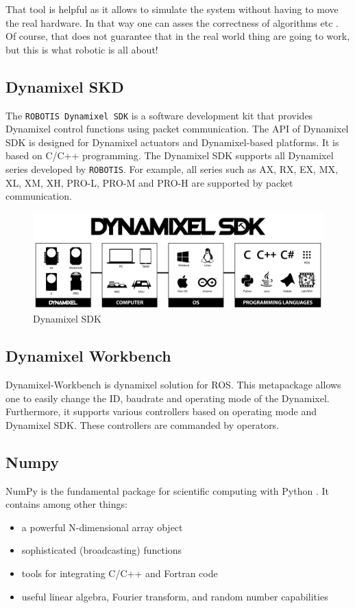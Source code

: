 That tool is helpful as it allows to simulate the system without having to move the real hardware. In that way one can asses the correctness of algorithms etc . Of course, that does not guarantee that in the real world thing are going to work, but this is what robotic is all about!

\subsection{Dynamixel SKD}
The \texttt{ROBOTIS Dynamixel SDK} is a software development kit that provides Dynamixel control functions using packet communication. The API of Dynamixel SDK is designed for Dynamixel actuators and Dynamixel-based platforms. It is based on C/C++ programming. The Dynamixel SDK supports all Dynamixel series developed by \texttt{ROBOTIS}. For example, all series such as AX, RX, EX, MX, XL, XM, XH, PRO-L, PRO-M and PRO-H are supported by packet communication.
\begin{figure}
	\centering
	\includegraphics[width=\textwidth]{img/sdk.jpg}%
	\caption{Dynamixel SDK}
	\label{fig:dynamixelSDK}
\end{figure}

\subsection{Dynamixel Workbench}
Dynamixel-Workbench is dynamixel solution for \ac{ROS}. This metapackage allows one to easily change the ID, baudrate and operating mode of the Dynamixel. Furthermore, it supports various controllers based on operating mode and Dynamixel SDK. These controllers are commanded by operators.


\subsection{Numpy}
NumPy is the fundamental package for scientific computing with Python \cite{numpy}. It contains among other things:
\begin{itemize}
    \item a powerful N-dimensional array object
    \item sophisticated (broadcasting) functions
    \item tools for integrating C/C++ and Fortran code
    \item useful linear algebra, Fourier transform, and random number capabilities
\end{itemize}

